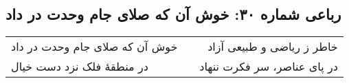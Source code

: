 \begin{center}
\section*{رباعی شماره ۳۰: خوش آن که صلای جام وحدت در داد}
\label{sec:030}
\begin{longtable}{l p{0.5cm} r}
خوش آن که صلای جام وحدت در داد
&&
خاطر ز ریاضی و طبیعی آزاد
\\
در منطقهٔ فلک نزد دست خیال
&&
در پای عناصر، سر فکرت ننهاد
\\
\end{longtable}
\end{center}
